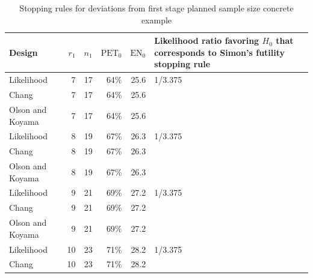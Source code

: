 \documentclass[12pt]{report}\usepackage[]{graphicx}\usepackage[]{color}
\newlength{\li}\setlength{\li}{14.48pt}
\begin{document}
\begin{table}[]
\centering
\caption{Stopping rules for deviations from first stage planned sample size concrete example}
\hspace*{-3.5cm}
\begin{tabular}{|L|R|R|R|R|L|}
\hline
Design           & $r_1$ & $n_1$ & $\mbox{PET}_0$ & $\mbox{EN}_0$ & Likelihood ratio favoring $H_0$ that corresponds to Simon's futility stopping rule \\ \hline
Likelihood       & 7     & 17    & 64\%           & 25.6          & 1/3.375                                                                            \\ \hline
Chang            & 7     & 17    & 64\%           & 25.6          &                                                                                    \\ \hline
Olson and Koyama & 7     & 17    & 64\%           & 25.6          &                                                                                    \\ \hline
Likelihood       & 8     & 19    & 67\%           & 26.3          & 1/3.375                                                                            \\ \hline
Chang            & 8     & 19    & 67\%           & 26.3          &                                                                                    \\ \hline
Olson and Koyama & 8     & 19    & 67\%           & 26.3          &                                                                                    \\ \hline
Likelihood       & 9     & 21    & 69\%           & 27.2          & 1/3.375                                                                            \\ \hline
Chang            & 9     & 21    & 69\%           & 27.2          &                                                                                    \\ \hline
Olson and Koyama & 9     & 21    & 69\%           & 27.2          &                                                                                    \\ \hline
Likelihood       & 10    & 23    & 71\%           & 28.2          & 1/3.375                                                                            \\ \hline
Chang            & 10    & 23    & 71\%           & 28.2          &                                                                                    \\ \hline

\end{tabular}
\end{table}
\end{document}
